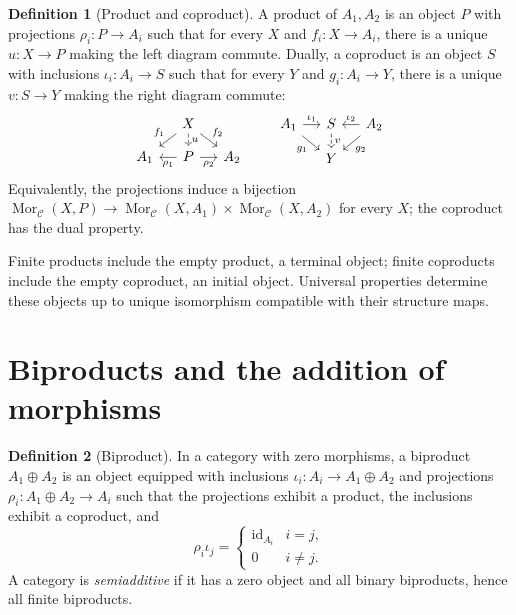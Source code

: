 \documentclass[11pt]{article}
\theoremstyle{definition}
\newtheorem{definition}{Definition}[section]
\theoremstyle{plain}
\newcommand{\C}{\mathcal C}
\newcommand{\Mor}{\operatorname{Mor}}
\newcommand{\id}{\operatorname{id}}
\begin{document}
\begin{definition}[Product and coproduct]
A product of $A_1,A_2$ is an object $P$ with projections $\rho_i\colon P\to A_i$ such that for every $X$ and $f_i\colon X\to A_i$, there is a unique $u\colon X\to P$ making the left diagram commute. Dually, a coproduct is an object $S$ with inclusions $\iota_i\colon A_i\to S$ such that for every $Y$ and $g_i\colon A_i\to Y$, there is a unique $v\colon S\to Y$ making the right diagram commute:
\[
\begin{tikzcd}[column sep=small,row sep=small]
&X\arrow[dl,"f_1"']\arrow[d,dashed,"u"]\arrow[dr,"f_2"]&\\
A_1&P\arrow[l,"\rho_1"]\arrow[r,"\rho_2"']&A_2
\end{tikzcd}
\qquad
\begin{tikzcd}[column sep=small,row sep=small]
A_1\arrow[r,"\iota_1"]\arrow[dr,"g_1"']&S\arrow[d,dashed,"v"]&A_2\arrow[l,"\iota_2"']\arrow[dl,"g_2"]\\
&Y&
\end{tikzcd}
\]
Equivalently, the projections induce a bijection
$\Mor_{\C}(X,P)\to\Mor_{\C}(X,A_1)\times\Mor_{\C}(X,A_2)$ for every $X$; the coproduct has the dual property.
\end{definition}
Finite products include the empty product, a terminal object; finite coproducts include the empty coproduct, an initial object. Universal properties determine these objects up to unique isomorphism compatible with their structure maps.

\section{Biproducts and the addition of morphisms}
\begin{definition}[Biproduct]
In a category with zero morphisms, a biproduct $A_1\oplus A_2$ is an object equipped with inclusions $\iota_i\colon A_i\to A_1\oplus A_2$ and projections $\rho_i\colon A_1\oplus A_2\to A_i$ such that the projections exhibit a product, the inclusions exhibit a coproduct, and
\[
\rho_i\iota_j=\begin{cases}\id_{A_i}&i=j,\\0&i\ne j.\end{cases}
\]
A category is \emph{semiadditive} if it has a zero object and all binary biproducts, hence all finite biproducts.
\end{definition}
\end{document}
